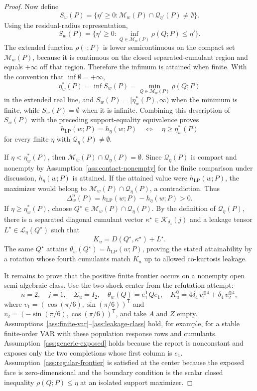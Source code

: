 \documentclass[11pt]{article}
\newcommand{\transpose}{\mathsf{T}}
\theoremstyle{definition}
\theoremstyle{plain}
\theoremstyle{remark}
\begin{document}
\begin{proof}
Now define
\[
S_w(P)=\{\eta'\ge0:\mathcal M_w(P)\cap\mathcal Q_{\eta'}(P)\ne\emptyset\}.
\]
Using the residual-radius representation,
\[
S_w(P)=\{\eta'\ge0:\inf_{Q\in\mathcal M_w(P)}\rho(Q;P)\le \eta'\}.
\]
The extended function \(\rho(\cdot;P)\) is lower semicontinuous on the compact set \(\mathcal M_w(P)\), because it is continuous on the closed separated-cumulant region and equals \(+\infty\) off that region.  Therefore the infimum is attained when finite.  With the convention that \(\inf\emptyset=+\infty\),
\[
\eta_w^*(P)
=\inf S_w(P)
=\min_{Q\in\mathcal M_w(P)}\rho(Q;P)
\]
in the extended real line, and \(S_w(P)=[\eta_w^*(P),\infty)\) when the minimum is finite, while \(S_w(P)=\emptyset\) when it is infinite.  Combining this description of \(S_w(P)\) with the preceding support-equality equivalence proves
\[
h_{\mathrm{LP}}(w;P)=h_\eta(w;P)
\quad\Longleftrightarrow\quad
\eta\ge\eta_w^*(P)
\]
for every finite \(\eta\) with \(\mathcal Q_\eta(P)\ne\emptyset\).

If \(\eta<\eta_w^*(P)\), then \(\mathcal M_w(P)\cap\mathcal Q_\eta(P)=\emptyset\).  Since \(\mathcal Q_\eta(P)\) is compact and nonempty by Assumption~\ref{ass:contact-nonempty} for the finite comparison under discussion, \(h_\eta(w;P)\) is attained.  If the attained value were \(h_{\mathrm{LP}}(w;P)\), the maximizer would belong to \(\mathcal M_w(P)\cap\mathcal Q_\eta(P)\), a contradiction.  Thus
\[
\Delta_w^\eta(P)=h_{\mathrm{LP}}(w;P)-h_\eta(w;P)>0 .
\]
If \(\eta\ge\eta_w^*(P)\), choose \(Q^\star\in\mathcal M_w(P)\cap\mathcal Q_\eta(P)\).  By the definition of \(\mathcal Q_\eta(P)\), there is a separated diagonal cumulant vector \(\kappa^\star\in\mathcal K_{\delta_4}(j)\) and a leakage tensor \(L^\star\in\mathcal L_\eta(Q^\star)\) such that
\[
K_u=D(Q^\star,\kappa^\star)+L^\star .
\]
The same \(Q^\star\) attains \(\theta_w(Q^\star)=h_{\mathrm{LP}}(w;P)\), proving the stated attainability by a rotation whose fourth cumulants match \(K_u\) up to allowed co-kurtosis leakage.

It remains to prove that the positive finite frontier occurs on a nonempty open semi-algebraic class.  Use the two-shock center from the refutation attempt:
\[
n=2,\quad j=1,\quad \Sigma_u=I_2,\quad
\theta_w(Q)=e_1^\transpose Qe_1,\quad
K_u^0=4\delta_4\,v_1^{\otimes4}+\delta_4\,v_2^{\otimes4},
\]
where \(v_1=(\cos(\pi/6),\sin(\pi/6))^\transpose\) and \(v_2=(-\sin(\pi/6),\cos(\pi/6))^\transpose\), and take \(A\) and \(Z\) empty.  Assumptions~\ref{ass:finite-var}--\ref{ass:leakage-class} hold, for example, for a stable finite-order VAR with these population response rows and cumulants.  Assumption~\ref{ass:generic-exposed} holds because the report is nonconstant and exposes only the two completions whose first column is \(e_1\).  Assumption~\ref{ass:regular-frontier} is satisfied at the center because the exposed face is zero-dimensional and the boundary condition is the scalar closed inequality \(\rho(Q;P)\le\eta\) at an isolated support maximizer.


\end{proof}
\end{document}
